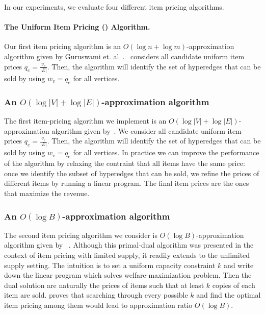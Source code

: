 
In our experiments, we evaluate four different item pricing algorithms.

\paragraph{The Uniform Item Pricing (\uip) Algorithm.}
Our first item pricing algorithm is an $O(\log n + \log m)$-approximation algorithm given by Guruswami et. al~\cite{guruswami2005profit}. \uip\ considers all candidate uniform item prices $q_e = \frac{v_e}{|E|}$. Then, the algorithm will identify the set of hyperedges that can be sold by using $w_v = q_e$ for all vertices.

\subsubsection{An $O(\log |V|+\log |E|)$-approximation algorithm}

The first item-pricing algorithm we implement is an $O(\log |V| + \log |E|)$-approximation algorithm given by~\cite{guruswami2005profit}. We consider all candidate uniform item prices $q_e = \frac{v_e}{|E|}$. Then, the algorithm will identify the set of hyperedges that can be sold by using $w_v = q_e$ for all vertices. In practice we can improve the performance of the algorithm by relaxing the contraint that all items have the same price: once we identify the subset of hyperedges that can be sold, we refine the prices of different items by running a linear program. The final item prices are the ones that maximize the revenue. 

\subsubsection{An $O(\log B)$-approximation algorithm}

The second item pricing algorithm we consider is $O(\log B)$-approximation algorithm given by ~\cite{cheung2008approximation}. Although this primal-dual algorithm was presented in the context of item pricing with limited supply, it readily extends to the unlimited supply setting. The intuition is to set a uniform capacity constraint $k$ and write down the linear program which solves welfare-maximization problem. Then the dual solution are naturally the prices of items such that at least $k$ copies of each item are sold. \cite{cheung2008approximation} proves that
searching through every possible $k$ and find the optimal item pricing among them would lead to approximation ratio $O(\log B)$.

